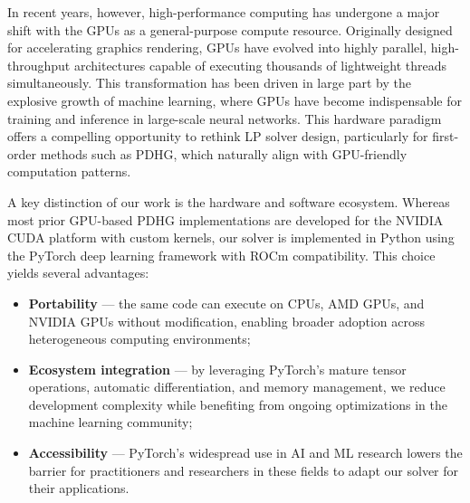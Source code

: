 \documentclass[twoside,12pt,openright]{report}  %
\begin{document}
In recent years, however, high-performance computing has undergone a major shift with the GPUs as a general-purpose compute resource. Originally designed for accelerating graphics rendering, GPUs have evolved into highly parallel, high-throughput architectures capable of executing thousands of lightweight threads simultaneously. This transformation has been driven in large part by the explosive growth of machine learning, where GPUs have become indispensable for training and inference in large-scale neural networks. This hardware paradigm offers a compelling opportunity to rethink LP solver design, particularly for first-order methods such as PDHG, which naturally align with GPU-friendly computation patterns.



A key distinction of our work is the hardware and software ecosystem. Whereas most prior GPU-based PDHG implementations are developed for the NVIDIA CUDA platform with custom kernels, our solver is implemented in Python using the PyTorch deep learning framework with ROCm compatibility. This choice yields several advantages: 
\begin{itemize}
    \item \textbf{Portability} — the same code can execute on CPUs, AMD GPUs, and NVIDIA GPUs without modification, enabling broader adoption across heterogeneous computing environments;  
    \item \textbf{Ecosystem integration} — by leveraging PyTorch’s mature tensor operations, automatic differentiation, and memory management, we reduce development complexity while benefiting from ongoing optimizations in the machine learning community;  
    \item \textbf{Accessibility} — PyTorch’s widespread use in AI and ML research lowers the barrier for practitioners and researchers in these fields to adapt our solver for their applications.
\end{itemize}
\end{document}

